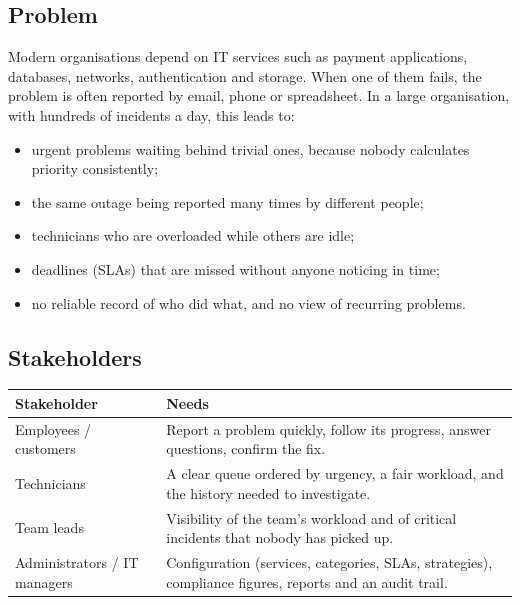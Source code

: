 \documentclass[11pt,a4paper]{article}
\begin{document}
\subsection{Problem}
Modern organisations depend on IT services such as payment applications, databases, networks, authentication and storage. When one of them fails, the problem is often reported by email, phone or spreadsheet. In a large organisation, with hundreds of incidents a day, this leads to:
\begin{itemize}
  \item urgent problems waiting behind trivial ones, because nobody calculates priority consistently;
  \item the same outage being reported many times by different people;
  \item technicians who are overloaded while others are idle;
  \item deadlines (SLAs) that are missed without anyone noticing in time;
  \item no reliable record of who did what, and no view of recurring problems.
\end{itemize}

\subsection{Stakeholders}
\begin{tabularx}{\linewidth}{@{}L{4.2cm}Y@{}}
\toprule
\textbf{Stakeholder} & \textbf{Needs} \\
\midrule
Employees / customers & Report a problem quickly, follow its progress, answer questions, confirm the fix. \\
Technicians & A clear queue ordered by urgency, a fair workload, and the history needed to investigate. \\
Team leads & Visibility of the team's workload and of critical incidents that nobody has picked up. \\
Administrators / IT managers & Configuration (services, categories, SLAs, strategies), compliance figures, reports and an audit trail. \\
\bottomrule
\end{tabularx}
\end{document}
